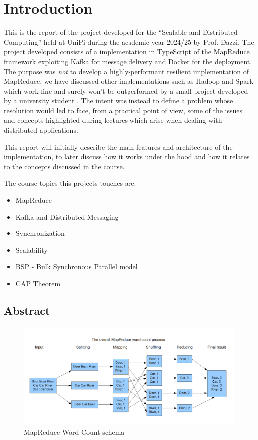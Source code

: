 \chapter{Introduction}
\lstset{language=javascript}


This is the report of the project developed for the ``Scalable and Distributed Computing'' held at UniPi during the academic year 2024/25 by Prof. Dazzi.
The project developed consists of a implementation in TypeScript of the MapReduce framework exploiting Kafka for message delivery and Docker for the deployment.
The purpose was \textit{not} to develop a highly-performant resilient implementation of MapReduce, we have discussed other implementations such as Hadoop and Spark which work fine and surely won't be outperformed by a small project developed by a university student \smiley. The intent was instead to define a problem whose resolution would led to face, from a practical point of view, some of the issues and concepts highlighted during lectures which arise when dealing with distributed applications.

This report will initially describe the main features and architecture of the implementation, to later discuss how it works under the hood and how it relates to the concepts discussed in the course.

\nl

{The course topics this projects touches are:\ns
\begin{itemize}
   \item MapReduce
   \item Kafka and Distributed Messaging
   \item Synchronization
   \item Scalability
   \item BSP - Bulk Synchronous Parallel model
   \item CAP Theorem
\end{itemize}}
\newpage

\section{Abstract}
\begin{figure}[htbp]
   \centering
   \includegraphics[width=\columnwidth]{images/mapreduce.png}
   \caption{MapReduce Word-Count schema}
   \label{fig:mapreduce}
\end{figure}


